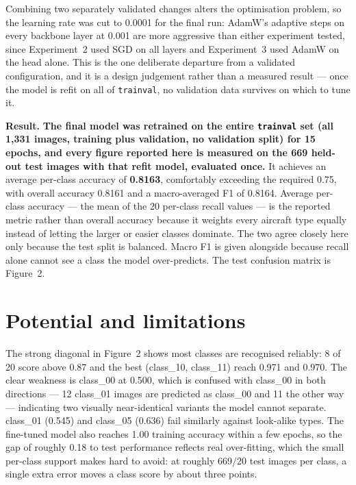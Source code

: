 \documentclass[10pt,a4paper,twocolumn]{article}
\begin{document}
Combining two separately validated changes alters the optimisation problem, so the learning rate
was cut to 0.0001 for the final run: AdamW's adaptive steps on every backbone layer at 0.001 are
more aggressive than either experiment tested, since Experiment~2 used SGD on all layers and
Experiment~3 used AdamW on the head alone. This is the one deliberate departure from a validated
configuration, and it is a design judgement rather than a measured result --- once the model is
refit on all of \texttt{trainval}, no validation data survives on which to tune it.

\textbf{Result.} \textbf{The final model was retrained on the entire \texttt{trainval} set (all
1,331 images, training plus validation, no validation split) for 15 epochs, and
every figure reported here is measured on the 669 held-out test images with that refit model,
evaluated once.} It achieves an average per-class accuracy of \textbf{0.8163}, comfortably
exceeding the required 0.75, with overall accuracy 0.8161 and a macro-averaged F1 of 0.8164.
Average per-class accuracy --- the mean of the 20 per-class recall values --- is the
reported metric rather than overall accuracy because it weights every aircraft type equally
instead of letting the larger or easier classes dominate. The two agree closely here only because
the test split is balanced. Macro F1 is given alongside because recall alone cannot see a class
the model over-predicts. The test confusion matrix is Figure~2.

\section{Potential and limitations}
The strong diagonal in Figure~2 shows most classes are recognised reliably: 8 of
20 score above 0.87 and the best (class\_10, class\_11) reach 0.971 and 0.970. The
clear weakness is class\_00 at 0.500, which is confused with class\_00 in both directions
--- 12 class\_01 images are predicted as class\_00 and 11 the other way --- indicating two
visually near-identical variants the model cannot separate. class\_01 (0.545) and class\_05
(0.636) fail similarly against look-alike types. The fine-tuned model also reaches
1.00 training accuracy within a few epochs, so the gap of roughly 0.18 to test performance
reflects real over-fitting, which the small per-class support makes hard to avoid: at roughly
669$/$20 test images per class, a single extra error moves a class score by about
three points.
\end{document}
